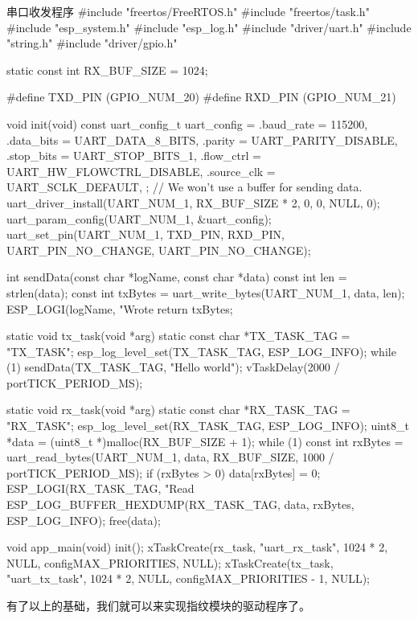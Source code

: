 \documentclass[lang=cn,newtx,10pt,scheme=chinese]{elegantbook}
\begin{document}
\begin{mycode}{串口收发程序}
#include "freertos/FreeRTOS.h"
#include "freertos/task.h"
#include "esp_system.h"
#include "esp_log.h"
#include "driver/uart.h"
#include "string.h"
#include "driver/gpio.h"

static const int RX_BUF_SIZE = 1024;

#define TXD_PIN (GPIO_NUM_20)
#define RXD_PIN (GPIO_NUM_21)

void init(void)
{
    const uart_config_t uart_config = {
        .baud_rate = 115200,
        .data_bits = UART_DATA_8_BITS,
        .parity = UART_PARITY_DISABLE,
        .stop_bits = UART_STOP_BITS_1,
        .flow_ctrl = UART_HW_FLOWCTRL_DISABLE,
        .source_clk = UART_SCLK_DEFAULT,
    };
    // We won't use a buffer for sending data.
    uart_driver_install(UART_NUM_1, RX_BUF_SIZE * 2, 0, 0, NULL, 0);
    uart_param_config(UART_NUM_1, &uart_config);
    uart_set_pin(UART_NUM_1, TXD_PIN, RXD_PIN, UART_PIN_NO_CHANGE, UART_PIN_NO_CHANGE);
}

int sendData(const char *logName, const char *data)
{
    const int len = strlen(data);
    const int txBytes = uart_write_bytes(UART_NUM_1, data, len);
    ESP_LOGI(logName, "Wrote %
    return txBytes;
}

static void tx_task(void *arg)
{
    static const char *TX_TASK_TAG = "TX_TASK";
    esp_log_level_set(TX_TASK_TAG, ESP_LOG_INFO);
    while (1)
    {
        sendData(TX_TASK_TAG, "Hello world");
        vTaskDelay(2000 / portTICK_PERIOD_MS);
    }
}

static void rx_task(void *arg)
{
    static const char *RX_TASK_TAG = "RX_TASK";
    esp_log_level_set(RX_TASK_TAG, ESP_LOG_INFO);
    uint8_t *data = (uint8_t *)malloc(RX_BUF_SIZE + 1);
    while (1)
    {
        const int rxBytes = uart_read_bytes(UART_NUM_1, data, RX_BUF_SIZE, 1000 / portTICK_PERIOD_MS);
        if (rxBytes > 0)
        {
            data[rxBytes] = 0;
            ESP_LOGI(RX_TASK_TAG, "Read %
            ESP_LOG_BUFFER_HEXDUMP(RX_TASK_TAG, data, rxBytes, ESP_LOG_INFO);
        }
    }
    free(data);
}

void app_main(void)
{
    init();
    xTaskCreate(rx_task, "uart_rx_task", 1024 * 2, NULL, configMAX_PRIORITIES, NULL);
    xTaskCreate(tx_task, "uart_tx_task", 1024 * 2, NULL, configMAX_PRIORITIES - 1, NULL);
}
\end{mycode}

有了以上的基础，我们就可以来实现指纹模块的驱动程序了。
\end{document}
